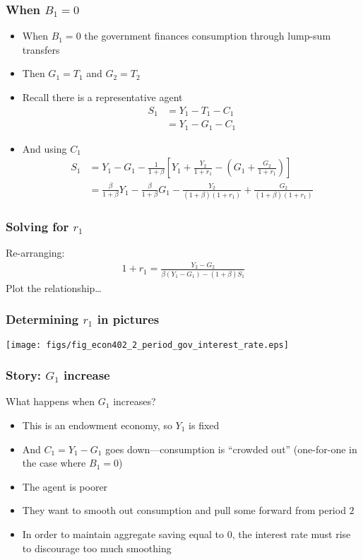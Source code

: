 \documentclass[presentation,dvipsnames]{beamer}
\begin{document}
\begin{frame}
\frametitle{When $B_{1} = 0$}
\begin{itemize}[label={--}]
\item When $B_{1} = 0$ the government finances consumption through lump-sum transfers
\item Then $G_{1} = T_{1}$ and $G_{2} = T_{2}$
\item Recall there is a representative agent
\begin{align*}
S_{1} &= Y_{1} - T_{1} - C_{1} \\
&= Y_{1} - G_{1} - C_{1}
\end{align*}
\item And using $C_{1}$
\begin{align*}
S_{1} &= Y_{1} - G_{1} - \frac{1}{1+\beta} \left[ Y_{1} + \frac{Y_{2}}{1+r_{1}} - \left( G_{1} + \frac{G_{2}}{1+r_{1}} \right) \right] \\
&= \frac{\beta}{1+\beta}Y_{1} - \frac{\beta}{1+\beta} G_{1} - \frac{Y_{2}}{(1+\beta)(1+r_{1})} + \frac{G_{2}}{(1+\beta)(1+r_{1})}
\end{align*}
\end{itemize}
\end{frame}

\begin{frame}
\frametitle{Solving for $r_1$}
Re-arranging:
\begin{align*}
1+r_{1} = \frac{Y_{2}-G_{2}}{\beta \left( Y_{1}-G_{1} \right) - (1+\beta)S_{1}}
\end{align*}
Plot the relationship\dots
\end{frame}

\begin{frame}
\frametitle{Determining $r_{1}$ in pictures}
\centerline{\texttt{[image: figs/fig\_econ402\_2\_period\_gov\_interest\_rate.eps]}}
\end{frame}

\begin{frame}
\frametitle{Story: $G_{1}$ increase}
What happens when $G_{1}$ increases?
\begin{itemize}[label={--}]
\item This is an endowment economy, so $Y_{1}$ is fixed
\item And $C_{1} = Y_{1} - G_{1}$ goes down---consumption is ``crowded out'' (one-for-one in the case where $B_{1} = 0$)
\item The agent is poorer
\item They want to smooth out consumption and pull some forward from period $2$
\item In order to maintain aggregate saving equal to $0$, the interest rate must rise to discourage too much smoothing
\end{itemize}
\end{frame}
\end{document}
